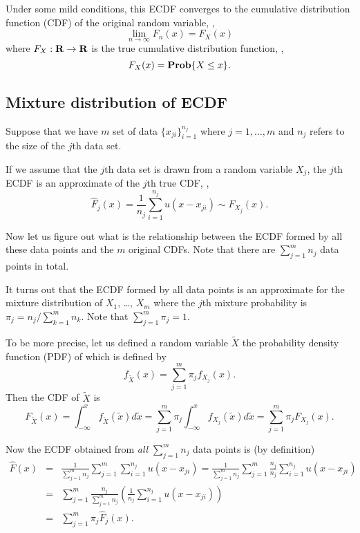 Under some mild conditions, this ECDF converges to the cumulative distribution function (CDF) of the original random variable,
\ie,
\begin{equation}
\lim_{n\to\infty} F_n(x) = F_X(x)
\end{equation}
where $F_X:\mathbf{R}\to\mathbf{R}$ is the true cumulative distribution function,
\ie,
\begin{equation}
F_X(x) = \mathop{\bf Prob}\{X\leq x\}.
\end{equation}

\subsection{Mixture distribution of ECDF}

Suppose that we have $m$ set of data $\{x_{ji}\}_{i=1}^{n_j}$
where $j=1,\ldots, m$ and $n_j$ refers to the size of the $j$th data set.

If we assume that the $j$th data set is drawn from a random variable $X_j$,
the $j$th ECDF is an approximate of the $j$th true CDF,
\ie,
\begin{equation}
\hat{F}_j(x) = \frac{1}{n_j} \sum_{i=1}^{n_j} u(x-x_{ji})
\sim F_{X_j}(x).
\end{equation}

Now let us figure out what is the relationship between the ECDF formed by all these data points
and the $m$ original CDFs.
Note that there are $\sum_{j=1}^m n_j$ data points in total.

It turns out that the ECDF formed by all data points is an approximate for the mixture distribution
of $X_1$, \ldots, $X_m$
where the $j$th mixture probability is $\pi_j = n_j / \sum_{k=1}^m n_k$.
Note that $\sum_{j=1}^m \pi_j = 1$.

To be more precise, let us defined a random variable $\tilde{X}$
the probability density function (PDF) of which is defined by
\begin{equation}
\label{eq:gyusj}
f_{\tilde{X}}(x) = \sum_{j=1}^m \pi_j f_{X_j}(x).
\end{equation}
Then the CDF of $\tilde{X}$ is
\begin{equation}
F_{\tilde{X}}(x)
= \int_{-\infty}^x f_{\tilde{X}}(\tilde{x}) d\tilde{x}
= \sum_{j=1}^m \pi_j \int_{-\infty}^x f_{X_j}(\tilde{x}) d\tilde{x}
= \sum_{j=1}^m \pi_j F_{X_j}(x).
\end{equation}

Now the ECDF obtained from \emph{all} $\sum_{j=1}^m n_j$ data points is (by definition)
\begin{eqnarray*}
\hat{F}(x) &=& \frac{1}{\sum_{j=1}^m n_j} \sum_{j=1}^m \sum_{i=1}^{n_j} u(x-x_{ji})
= \frac{1}{\sum_{j=1}^m n_j} \sum_{j=1}^m \frac{n_j}{n_j} \sum_{i=1}^{n_j} u(x-x_{ji})
\\
&=&
\sum_{j=1}^m \frac{n_j}{\sum_{j=1}^m n_j} \left( \frac{1}{n_j} \sum_{i=1}^{n_j} u(x-x_{ji}) \right)
\\
&=&
\sum_{j=1}^m \pi_j \hat{F}_j(x).
\end{eqnarray*}

